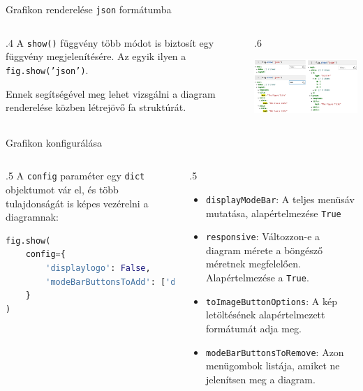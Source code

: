 \documentclass[english, aspectratio=169]{beamer}
\begin{document}
	\begin{frame}{Grafikon renderelése \texttt{json} formátumba}
		\begin{columns}
			\begin{column}{.4\textwidth}
				A \texttt{show()} függvény több módot is biztosít egy függvény megjelenítésére. Az egyik ilyen a \texttt{fig.show('json')}.\par\smallskip
				Ennek segítségével meg lehet vizsgálni a diagram renderelése közben létrejövő fa struktúrát. 
			\end{column}
			\begin{column}{.6\textwidth}
				\begin{center}
					\includegraphics[width=8cm, keepaspectratio]{images/plots_4.png}
				\end{center}
			\end{column}
		\end{columns}
	\end{frame}
	
	\begin{frame}[fragile]{Grafikon konfigurálása}
		\begin{columns}
			\begin{column}{.5\textwidth}
				A \texttt{config} paraméter egy \texttt{dict} objektumot vár el, és több tulajdonságát is képes vezérelni a diagramnak:
				\vspace{0.3cm}
				\begin{lstlisting}[language=python]
fig.show(
	config={
		'displaylogo': False,
		'modeBarButtonsToAdd': ['drawrect', 'drawcircle', 'eraseshape']
	}
)
				\end{lstlisting}
			\end{column}
			\begin{column}{.5\textwidth}
				\begin{itemize}
					\item \texttt{displayModeBar}: A teljes menüsáv mutatása, alapértelmezése \texttt{True}
					\item \texttt{responsive}: Változzon-e a diagram mérete a böngésző méretnek megfelelően. Alapértelmezése a \texttt{True}.
					\item \texttt{toImageButtonOptions}: A kép letöltésének alapértelmezett formátumát adja meg. 
					\item \texttt{modeBarButtonsToRemove}: Azon menügombok listája, amiket ne jelenítsen meg a diagram. 
				\end{itemize}
			\end{column}
		\end{columns}
	\end{frame}
	
\end{document}
